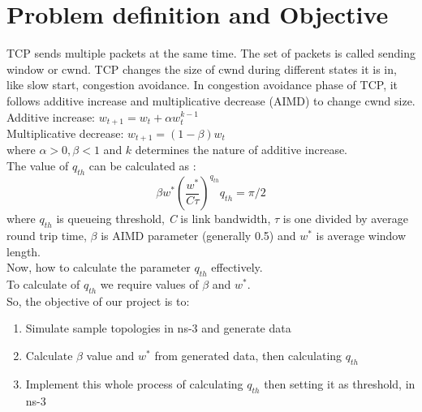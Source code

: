\clearpage
\section{Problem definition and Objective}
TCP sends multiple packets at the same time. The set of packets is called sending window or cwnd. TCP changes the size of cwnd during different states it is in, like slow start, congestion avoidance. In congestion avoidance phase of TCP, it follows additive increase and multiplicative decrease (AIMD) to change cwnd size. \\
Additive increase: \( w_{t+1} = w_{t} + \alpha w_{t}^{k-1} \)\\
Multiplicative decrease: \( w_{t+1} = (1-\beta)w_{t}  \)\\
where \( \alpha > 0, \beta < 1 \) and \( k \) determines the nature of additive increase.\\
The value of \( q_{th} \) can be calculated as \cite{manjunath2019compound}: \\ 
\[
    \beta w^* \left(\frac{w^*}{C \tau}\right)^{q_{th}}{q_{th}} = \pi/2
\]
where $ q_{th} $ is queueing threshold, \textit{C} is link bandwidth, $ \tau $ is one divided by average round trip time, $ \beta $ is AIMD parameter (generally 0.5) and $ w^* $ is average window length.\\
Now, how to calculate the parameter \( q_{th} \) effectively.  \\
To calculate of $ q_{th} $ we require values of $ \beta $ and $ w^* $. \\
So, the objective of our project is to: 
\begin{enumerate}
    \item Simulate sample topologies in ns-3 and generate data
    \item Calculate \( \beta \) value and $ w^* $ from generated data, then calculating \( q_{th} \) 
    \item Implement this whole process of calculating $ q_{th} $ then setting it as threshold, in ns-3 
\end{enumerate}

\clearpage

